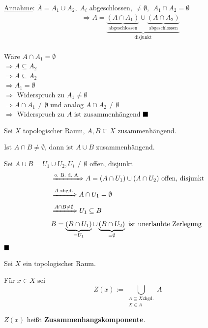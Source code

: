 \begin{beweis}
    \underline{Annahme}: $\overline{A} = A_1 \cup A_2,\; A_i$ abgeschlossen, $\neq \emptyset$,
    $\;A_1 \cap A_2 = \emptyset$
    \begin{align*}
        &\Rightarrow A = \underbrace{\underbrace{(A \cap A_1)}_\text{abgeschlossen} \cup \underbrace{(A \cap A_2)}_\text{abgeschlossen}}_\text{disjunkt}\\
    \end{align*}

    Wäre $A \cap A_1 = \emptyset$\\
    $\Rightarrow A \subseteq A_2$\\
    $\Rightarrow \overline{A} \subseteq A_2$\\
    $\Rightarrow A_1 = \emptyset$\\
    $\Rightarrow$ Widerspruch zu $A_1 \neq \emptyset$\\
    $\Rightarrow A \cap A_1 \neq \emptyset$ und analog 
                $A \cap A_2 \neq \emptyset$\\
    $\Rightarrow$ Widerspruch zu $A$ ist zusammenhängend $ \qed$
\end{beweis}

\begin{korollar}\label{zusammenhangVereinigung}
    Sei $X$ topologischer Raum, $A, B \subseteq X$ zusammenhängend.

    Ist $A \cap B \neq \emptyset$, dann ist $A \cup B$ zusammenhängend.
\end{korollar}

\begin{beweis}
    Sei $A \cup B = U_1 \cup U_2, U_i \neq \emptyset$ offen, disjunkt
    \begin{align*}
        &\xRightarrow{\text{o.~B.~d.~A.}} A = (A \cap U_1) \cup (A \cap U_2) \text{ offen, disjunkt}\\
        &\xRightarrow{A \text{ zhgd.}} A \cap U_1 = \emptyset\\
        &\xRightarrow{A \cap B \neq \emptyset} U_1 \subseteq B\\
        &B = \underbrace{(B \cap U_1)}_{= U_1} \cup \underbrace{(B \cap U_2)}_{= \emptyset} \text{ ist unerlaubte Zerlegung}
    \end{align*}
    $\qed$
\end{beweis}

\begin{definition}
    Sei $X$ ein topologischer Raum.
    
    Für $x \in X$ sei 
    \[Z(x) := \bigcup_{\substack{A \subseteq X \text{zhgd.}\\ X \in A}} A\]

     $Z(x)$ heißt \textbf{Zusammenhangskomponente}.
\end{definition}

